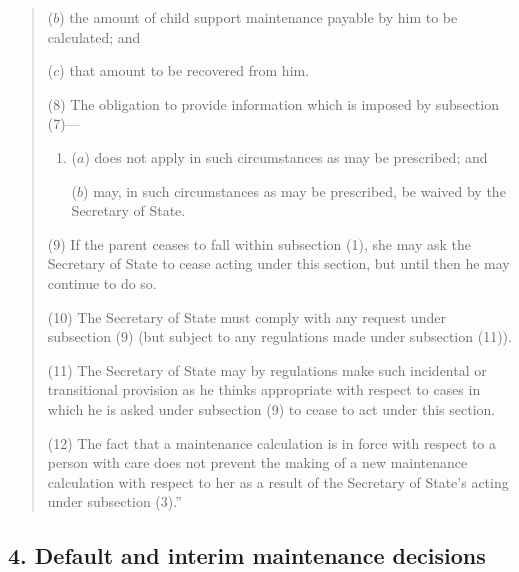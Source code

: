 \documentclass[12pt,a4paper]{article}
\begin{document}
\begin{quotation}
\begin{enumerate}
($b$) the amount of child support maintenance payable by him to be calculated; and

($c$) that amount to be recovered from him.
\end{enumerate}

(8) The obligation to provide information which is imposed by subsection (7)—
\begin{enumerate}\item[]
($a$) does not apply in such circumstances as may be prescribed; and

($b$) may, in such circumstances as may be prescribed, be waived by the Secretary of State.
\end{enumerate}

(9) If the parent ceases to fall within subsection (1), she may ask the Secretary of State to cease acting under this section, but until then he may continue to do so.

(10) The Secretary of State must comply with any request under subsection (9)  (but subject to any regulations made under subsection (11)).

(11) The Secretary of State may by regulations make such incidental or transitional provision as he thinks appropriate with respect to cases in which he is asked under subsection (9)  to cease to act under this section.

(12) The fact that a maintenance calculation is in force with respect to a person with care does not prevent the making of a new maintenance calculation with respect to her as a result of the Secretary of State’s acting under subsection (3).”
\end{quotation}


\subsection{4. Default and interim maintenance decisions}
\end{document}
